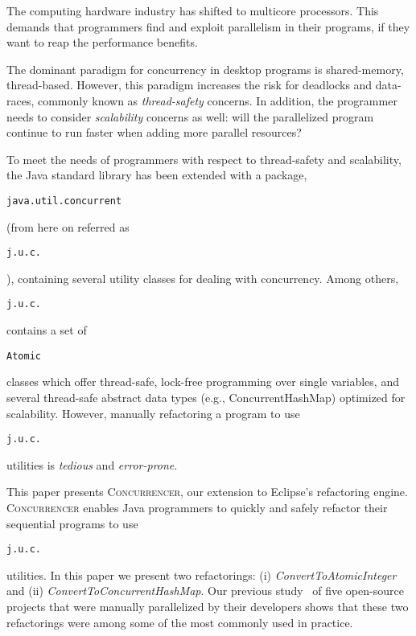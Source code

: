 \documentclass[10pt,preprint]{sigplanconf}
\newcommand\tool{{\smaller\textsc{Concurrencer}}\xspace}
\newcommand{\code}[1]{\begin{small}\texttt{#1}\end{small}}
\begin{document}
The computing hardware industry has shifted to multicore processors. This
demands that programmers find and exploit parallelism in their programs, if
they want to reap the performance benefits.



The dominant paradigm for concurrency in desktop programs is shared-memory,
thread-based. However, this paradigm increases the risk for deadlocks and
data-races, commonly known as \emph{thread-safety} concerns. In addition, the
programmer needs to consider \emph{scalability} concerns as well: will the
parallelized program continue to run faster when adding more parallel 
resources? 

To meet the needs of programmers with respect to thread-safety and scalability,
the Java standard library has been extended with a package,
\code{java.util.concurrent} (from here on referred as \code{j.u.c.}), containing
several utility classes for dealing with concurrency. Among others,
\code{j.u.c.} contains a set of \code{Atomic} classes which offer thread-safe,
lock-free programming over single variables, and several thread-safe abstract
data types (e.g., ConcurrentHashMap) optimized for scalability. However,
manually refactoring a program to use \code{j.u.c.} utilities is
\emph{tedious} and \emph{error-prone}.


This paper presents \tool, our extension to Eclipse's refactoring engine. \tool
enables Java programmers to quickly and safely refactor their sequential
programs to use \code{j.u.c.} utilities. In this paper we present two 
refactorings: (i) \emph{ConvertToAtomicInteger} and (ii) \emph{ConvertToConcurrentHashMap}.
Our previous study~\cite{Dig'08:studyOfConcurrentTransformations} of five
open-source projects that were manually parallelized by their developers shows
that these two refactorings were among some of the most commonly used in
practice.
\end{document}
